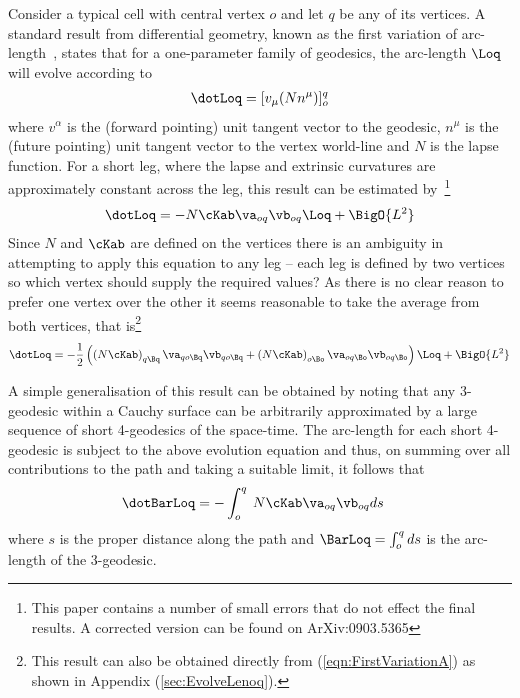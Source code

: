 \documentclass[a4paper,12pt]{article}
\numberwithin{equation}{section}
\begin{document}
Consider a typical cell with central vertex $o$ and let $q$ be any of its vertices. A
standard result from differential geometry, known as the first variation of
arc-length~\cite{berger-marcel:2003,chavel:2006-01,hicks:1965-01}, states that for a
one-parameter family of geodesics, the arc-length $\Loq$ will evolve according to
\begin{align}
   \label{eqn:FirstVariationA}
   \dotLoq = [v_\mu (Nn^\mu)]_o^q
\end{align}
where $v^\alpha$ is the (forward pointing) unit tangent vector to the geodesic, $n^\mu$ is
the (future pointing) unit tangent vector to the vertex world-line and $N$ is the lapse
function. For a short leg, where the lapse and extrinsic curvatures are approximately
constant across the leg, this result can be estimated by~\cite{brewin:2009-04}\footnote{%
This paper contains a number of small errors that do not effect the final results.
A corrected version can be found on ArXiv:0903.5365}
\begin{align}
   \dotLoq = - N \cKab \va_{oq} \vb_{oq} \Loq + \BigO{L^2}
\end{align}
Since $N$ and $\cKab$ are defined on the vertices there is an ambiguity in attempting to
apply this equation to any leg -- each leg is defined by two vertices so which vertex should
supply the required values? As there is no clear reason to prefer one vertex over the other
it seems reasonable to take the average from both vertices, that is\footnote{This result can
also be obtained directly from (\ref{eqn:FirstVariationA}) as shown in Appendix
(\ref{sec:EvolveLenoq}).}
\begin{align}
   \label{eqn:FirstVariationB}
   \dotLoq
   =
   - \frac{1}{2}
        \left(  \left(N \cKab\right)_{q\Bq} \va_{qo\Bq} \vb_{qo\Bq}
              + \left(N \cKab\right)_{o\Bo} \va_{oq\Bo} \vb_{oq\Bo} \right) \Loq
   + \BigO{L^2}
\end{align}

A simple generalisation of this result can be obtained by noting that any 3-geodesic within
a Cauchy surface can be arbitrarily approximated by a large sequence of short 4-geodesics of
the space-time. The arc-length for each short 4-geodesic is subject to the above evolution
equation and thus, on summing over all contributions to the path and taking a suitable
limit, it follows that
\begin{align}
   \label{eqn:IntegralDotL}
\dotBarLoq
   &= - \int_o^q\>N \cKab \va_{oq} \vb_{oq} ds
\end{align}
where $s$ is the proper distance along the path and $\BarLoq = \int_o^q ds$ is the
arc-length of the 3-geodesic.
\end{document}
